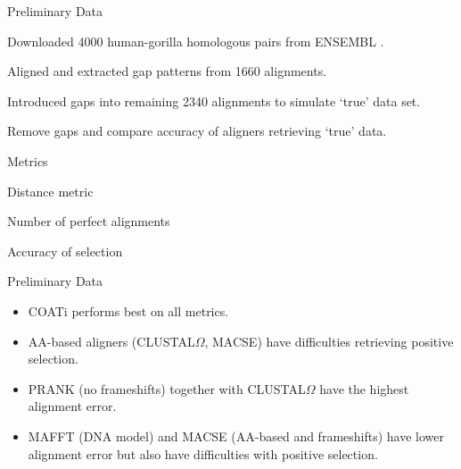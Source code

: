 \documentclass[aspectratio=169]{beamer}
\begin{document}


\begin{frame}{Preliminary Data} %
\begin{itemize}
	\item Downloaded 4000 human-gorilla homologous pairs from ENSEMBL
		\parencite{ensembl_hubbard_2002}.
	\item Aligned and extracted gap patterns from 1660 alignments.
	\item Introduced gaps into remaining 2340 alignments to simulate `true' data set.
	\item Remove gaps and compare accuracy of aligners retrieving `true' data.
	\item Metrics
	{\setlength\itemindent{15pt} \item[-] Distance metric}
	{\setlength\itemindent{15pt} \item[-] Number of perfect alignments}
	{\setlength\itemindent{15pt} \item[-] Accuracy of selection}

\end{itemize}
\end{frame} %

\begin{frame}{Preliminary Data} %
\resizebox{1.03\linewidth}{!}{%
\hspace{-0.8em}\centering{}
}
\vspace{1em}
\begin{itemize}
	\item COATi performs best on all metrics.
	\item AA-based aligners (CLUSTAL$\Omega$, MACSE) have difficulties retrieving
		positive selection.
	\item PRANK (no frameshifts) together with CLUSTAL$\Omega$ have the highest
		alignment error.
	\item MAFFT (DNA model) and MACSE (AA-based and frameshifts) have lower
		alignment error but also have difficulties with positive selection.
\end{itemize}
\end{frame} %
\end{document}
